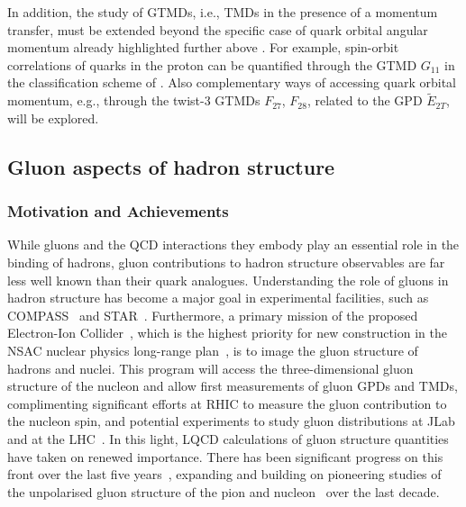 In addition, the study of GTMDs, i.e., TMDs in the presence of a
momentum transfer, must be extended beyond the specific case of quark
orbital angular momentum already highlighted further above
\cite{Engelhardt:2017miy}. For example, spin-orbit correlations of quarks
in the proton can be quantified through the GTMD $G_{11} $ in the
classification scheme of \cite{Meissner:2009ww}.
Also complementary ways of accessing quark orbital
momentum, e.g., through the twist-3 GTMDs $F_{27} $, $F_{28} $, related
to the GPD $\widetilde{E}_{2T} $, will be explored.











\subsection{Gluon aspects of hadron structure}

%


\subsubsection{Motivation and Achievements}

While gluons and the QCD interactions they embody play an essential role in the binding of hadrons, gluon contributions to hadron structure observables are far less well known than their quark analogues. Understanding the role of gluons in hadron structure has become a major goal in experimental facilities, such as COMPASS~\cite{Adare:2014hsq} and STAR~\cite{Djawotho:2013pga}. Furthermore, a primary mission of the proposed Electron-Ion Collider~\cite{Accardi:2012qut,Kalantarians:2014eda}, which is the highest priority for new construction in the NSAC nuclear physics long-range plan~\cite{Geesaman:2015fha}, is to image the gluon structure of hadrons and nuclei. This program will access the three-dimensional gluon structure of the nucleon and allow first measurements of gluon GPDs and TMDs, complimenting significant efforts at RHIC to measure the gluon contribution to the nucleon spin, and potential experiments to study gluon distributions at JLab~\cite{Maxwell:2018gci,Hattawy:2017woc,Dobbs:2017vjw} and at the LHC~\cite{Baltz:2007kq}. 
%
In this light, LQCD calculations of gluon structure quantities have taken on renewed importance. There has been significant progress on this front over the last five years~\cite{Alexandrou:2017oeh,Yang:2016plb,Detmold:2016gpy,Detmold:2017oqb,Winter:2017bfs,Alexandrou:2016ekb}, expanding and building on pioneering studies of the unpolarised gluon structure of the pion and nucleon~\cite{Meyer:2007tm,Horsley:2012pz,Alexandrou:2013tfa,Deka:2013zha} over the last decade. 

